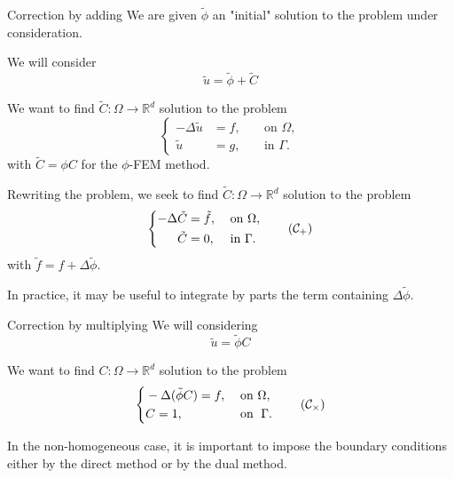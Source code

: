 \documentclass[compress,10pt,xcolor={table,dvipsnames},t]{beamer}
\begin{document}
	\begin{frame}{Correction by adding}
		We are given $\tilde{\phi}$ an "initial" solution to the problem under consideration.
		
		We will consider
		\begin{equation*}
			\tilde{u}=\tilde{\phi}+\tilde{C}
		\end{equation*}
	
		We want to find $\tilde{C}: \Omega \rightarrow \mathbb{R}^d$ solution to the problem
		\begin{equation*}
			\left\{\begin{aligned}
				-\Delta \tilde{u}&=f, \; &&\text{on } \Omega, \\
				\tilde{u}&=g, \; &&\text{in } \Gamma.
			\end{aligned}\right.
		\end{equation*}
		with $\tilde{C}=\phi C$ for the $\phi$-FEM method.
		
		Rewriting the problem, we seek to find $\tilde{C}: \Omega \rightarrow \mathbb{R}^d$ solution to the problem
		\begin{equation}
			\left\{\begin{aligned}
				-\Delta \tilde{C}&=\tilde{f}, \; &&\text{on } \Omega, \\
				\tilde{C}&=0, \; &&\text{in } \Gamma.
			\end{aligned}\right. \tag{$\mathcal{C}_{+}$} \label{corr_add}
		\end{equation}
		with $\tilde{f}=f+\Delta\tilde{\phi}$.

		In practice, it may be useful to integrate by parts the term containing $\Delta \tilde{\phi}$.
	\end{frame}

	\begin{frame}{Correction by multiplying}
		We will considering 
		\begin{equation*}
			\tilde{u}=\tilde{\phi}C
		\end{equation*}
		
		We want to find $C: \Omega \rightarrow \mathbb{R}^d$ solution to the problem
		\begin{equation*}
			\left\{\begin{aligned}
				&-\Delta (\tilde{\phi}C)=f, \; &&\text{on } \Omega, \\
				&C=1, \; &&\text{on } \; \Gamma.
			\end{aligned}\right. \tag{$\mathcal{C}_\times$} \label{corr_mult}
		\end{equation*}
		
		In the non-homogeneous case, it is important to impose the boundary conditions either by the direct method or by the dual method.
	\end{frame}
\end{document}
